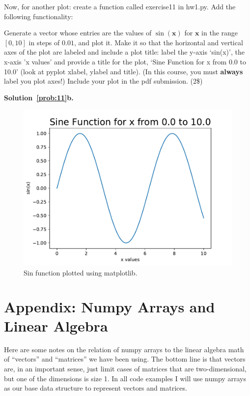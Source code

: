 \documentclass[10pt]{article}
\begin{document}
\begin{enumerate}
Now, for another plot: create a function called exercise11 in hw1.py.  Add the following functionality:

Generate a vector whose entries are the values of $\sin(\mathbf{x})$ for $\mathbf{x}$ in the range $[0,10]$ in steps of $0.01$, and plot it.  Make it so that the horizontal and vertical axes of the plot are labeled and include a plot title: label the y-axis `sin(x)', the x-axis 'x values' and provide a title for the plot, `Sine Function for x from 0.0 to 10.0' (look at pyplot xlabel, ylabel and title).  (In this course, you must {\bf always} label you plot axes!)  Include your plot in the pdf submission. (2\$)

{\bf Solution~\ref{prob:11}b.} 



\begin{figure}[H]
  \includegraphics[width=\linewidth]{exercise11_b.pdf}
  \caption{Sin function plotted using matplotlib. }
  \label{fig:exercise11_b}
\end{figure}

\end{enumerate}


\newpage

\section*{Appendix: Numpy Arrays and Linear Algebra}

Here are some notes on the relation of numpy arrays to the linear algebra math of ``vectors'' and ``matrices'' we have been using.  The bottom line is that vectors are, in an important sense, just limit cases of matrices that are two-dimensional, but one of the dimensions is size 1.  In all code examples I will use numpy arrays as our base data structure to represent vectors and matrices.
\end{document}
